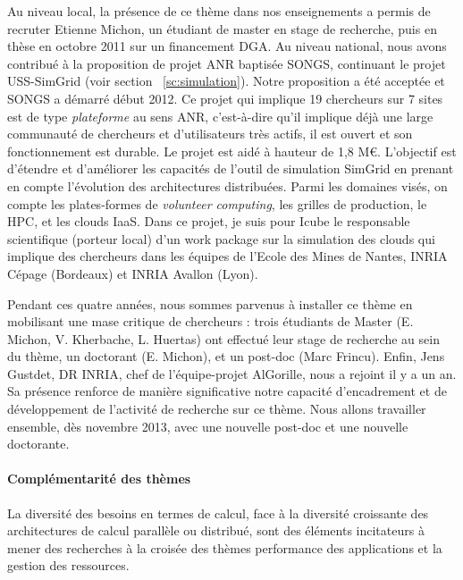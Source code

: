 \documentclass[11pt]{article}
\begin{document}
Au niveau  local, la  présence de ce  thème dans nos  enseignements a  permis de
recruter Etienne  Michon, un étudiant de  master en stage de  recherche, puis en
thèse en octobre 2011 sur un financement DGA. 
%
Au niveau national, nous avons contribué à la proposition de projet ANR baptisée
SONGS,     continuant      le     projet     USS-SimGrid      (voir     section~
\ref{sc:simulation}). Notre proposition a été  acceptée et SONGS a démarré début
2012.   Ce  projet  qui  implique  19   chercheurs  sur  7  sites  est  de  type
\emph{plateforme}  au  sens ANR,  c'est-à-dire  qu'il  implique déjà  une  large
communauté de  chercheurs et d'utilisateurs  très actifs,  il est ouvert  et son
fonctionnement  est durable.   Le projet  est aidé  à hauteur  de 1,8  M\euro{}.
L'objectif est d'étendre  et d'améliorer les capacités de  l'outil de simulation
SimGrid en  prenant en compte  l'évolution des architectures  distribuées. Parmi
les domaines visés,  on compte les plates-formes  de \emph{volunteer computing},
les grilles de production,  le HPC, et les clouds IaaS. Dans  ce projet, je suis
pour Icube le responsable scientifique (porteur  local) d'un work package sur la
simulation des  clouds qui implique des  chercheurs dans les équipes  de l'Ecole
des Mines de Nantes, INRIA Cépage (Bordeaux) et INRIA Avallon (Lyon).

Pendant  ces  quatre années,  nous  sommes  parvenus  à  installer ce  thème  en
mobilisant  une  mase  critique  de  chercheurs  :  trois  étudiants  de  Master
(E. Michon, V.  Kherbache, L.  Huertas)  ont effectué leur stage de recherche au
sein du thème,  un doctorant (E. Michon), et un  post-doc (Marc Frincu).  Enfin,
Jens Gustdet, DR INRIA, chef de l'équipe-projet AlGorille, nous a rejoint il y a
un  an.    Sa  présence  renforce   de  manière  significative   notre  capacité
d'encadrement et de développement de l'activité  de recherche sur ce thème. Nous
allons travailler ensemble, dès novembre 2013, avec une nouvelle post-doc et une
nouvelle doctorante.





\paragraph{Complémentarité des thèmes}

La diversité des besoins en termes de calcul, face à la diversité croissante des
architectures de calcul parallèle ou  distribué, sont des éléments incitateurs à
mener des recherches à la croisée  des thèmes performance des applications et la
gestion des ressources.
\end{document}
